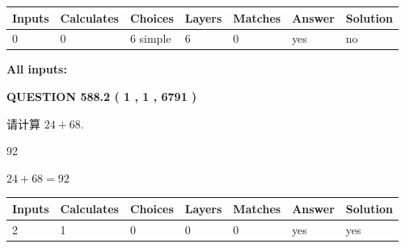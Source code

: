 \documentclass{ctexart}
\begin{document}
   
\noindent\begin{tabular}{|l|l|l|l|l|l|l|}
 \hline
Inputs & Calculates & Choices & Layers & Matches & Answer & Solution \\ \hline
 0  & 
 0  & 
 6
  simple  
  & 
 6  & 
 0  & 
  yes & 
  no 
  \\ \hline
 \end{tabular}
   
   
   
   
\noindent{}
   
   
   
   
\noindent\vspace{0.1in}\hspace{-0.08in} {\textbf{\Large{All inputs: }}}
   
   
  
\vspace{0.2in}
  
{\textbf{\Large{QUESTION
588.2 
 ( 1 , 1 , 6791 )
}}}
  
  
 
请计算 $ %
24 +  %
68 $.
 
 
 
\noindent{}
 
 

92
 
 
\noindent{}
 
 

 
 
 
\noindent{}
 
 

$ %
24 +  %
68=   %
92$
 
 
\noindent{}
 
 

 
   
   
   
   
\noindent\begin{tabular}{|l|l|l|l|l|l|l|}
 \hline
Inputs & Calculates & Choices & Layers & Matches & Answer & Solution \\ \hline
 2  & 
 1  & 
 0
  & 
 0  & 
 0  & 
  yes & 
  yes 
  \\ \hline
 \end{tabular}
   
\end{document}
